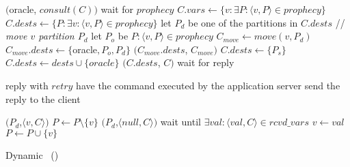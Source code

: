 \begin{algorithm}[h!]
\small

\begin{distribalgo}[1]

\vspace{1.25mm}


\vspace{1.0mm}

        \STATE \amcast$($oracle, $consult(C))$
        \STATE wait for $prophecy$
        \STATE $C.vars \leftarrow \{v: \exists P : \langle v, P \rangle \in prophecy \}$
        \STATE $C.dests \leftarrow \{P: \exists v : \langle v, P \rangle \in prophecy \}$
            \STATE let $P_d$ be one of the partitions in $C.dests$
                \STATE // \textit{move $v$ partition $P_d$}
                \STATE let $P_o$ be $P : \langle v, P \rangle \in prophecy$
                    \STATE $C_{move} \leftarrow move(v,P_d)$
                    \STATE $C_{move}.dests \leftarrow \{$oracle$,P_o,P_d\}$
                    \STATE \amcast$(C_{move}.dests$, $C_{move})$
                \ENDIF
            \ENDFOR
            \STATE $C.dests \leftarrow \{ P_s \}$
        \ENDIF
            \STATE $C.dests \leftarrow dests \cup \{oracle\}$
        \ENDIF
        \STATE \amcast$(C.dests$, $C)$
        \STATE wait for reply
    \ENDINDENT
\ENDINDENT

\vspace{1.25mm}


\vspace{1.0mm}

            \STATE reply with $retry$
        \ELSE
            \STATE have the command executed by the application server
            \STATE send the reply to the client
        \ENDIF
    \ENDINDENT

\vspace{1.0mm}
                \STATE \rmcast$(P_d$,$\langle v, C \rangle)$
                \STATE $P \leftarrow P \setminus \{v\}$
            \ELSE
                \STATE \rmcast$(P_d$,$\langle null, C \rangle)$
            \ENDIF
        \ELSE
            \STATE wait until $\exists val : \langle val, C \rangle \in rcvd\_vars$
                \STATE $v \leftarrow val$
                \STATE $P \leftarrow P \cup \{v\}$
            \ENDIF
        \ENDIF
    \ENDINDENT
\ENDINDENT

\caption{Dynamic \ssmr\ (\dssmr)}
\label{alg:dssmr}
\end{distribalgo}
\end{algorithm}